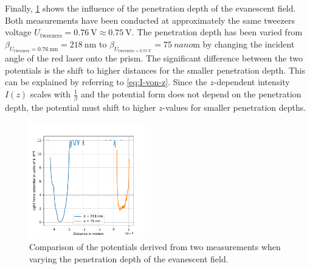 \documentclass[../bericht.tex]{subfiles}
\begin{document}
      Finally, \cref{fig:two-blocks} shows the influence of the penetration depth of the evanescent field. Both measurements have been conducted at approximately the same tweezers voltage $U_\mathrm{tweezers}=\SI{0,76}{\volt}\approx \SI{0,75}{\volt}$. The penetration depth has been varied from $\beta_{U_\mathrm{tweezers} = \SI{0,76}{\nano\meter}}=\SI{218}{\nano\meter}$ to $\beta_{U_\mathrm{tweezers = \SI{0,75}{\volt}}}=\SI{75}{nano\meter}$ by changing the incident angle of the red laser onto the prism. The significant difference between the two potentials is the shift to higher distances for the smaller penetration depth. This can be explained by referring to \cref{eq:I-von-z}. Since the $z$-dependent intensity $I(z)$ scales with $\frac{1}{\beta}$ and the potential form does not depend on the penetration depth, the potential must shift to higher $z$-values for smaller penetration depths.

      \begin{figure}[htb]
        \centering
        \includegraphics[width=0.45\textwidth]{figures/potentials12.pdf}
        \caption{Comparison of the potentials derived from two measurements when varying the penetration depth of the evanescent field.}
        \label{fig:two-blocks}
      \end{figure}
\end{document}
